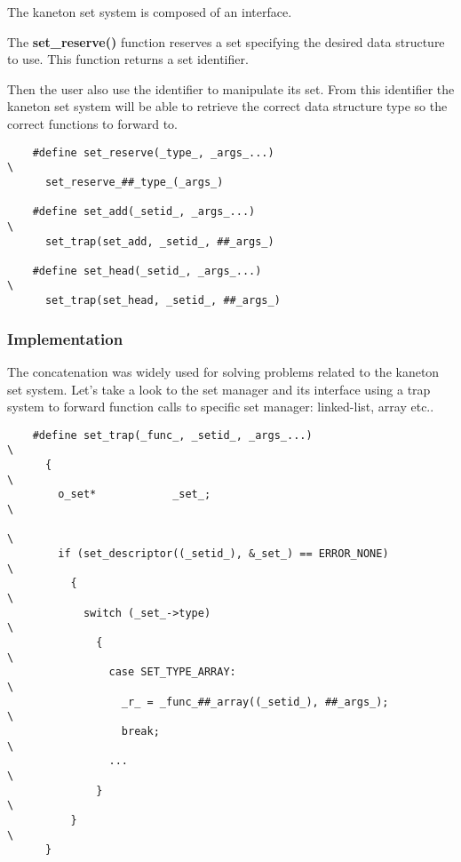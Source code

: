 {\begin{frame}[containsverbatim]
  The kaneton set system is composed of an interface.

  \nl

  The \textbf{set\_reserve()} function reserves a set specifying the desired
  data structure to use. This function returns a set identifier.

  \nl

  Then the user also use the identifier to manipulate its set. From this
  identifier the kaneton set system will be able to retrieve the correct
  data structure type so the correct functions to forward to.

  \begin{verbatim}
    #define set_reserve(_type_, _args_...)                                  \
      set_reserve_##_type_(_args_)

    #define set_add(_setid_, _args_...)                                     \
      set_trap(set_add, _setid_, ##_args_)

    #define set_head(_setid_, _args_...)                                    \
      set_trap(set_head, _setid_, ##_args_)
  \end{verbatim}
\end{frame}


\begin{frame}[containsverbatim]
  \frametitle{Implementation}

  The concatenation was widely used for solving problems related to
  the kaneton set system. Let's take a look to the set manager and its
  interface using a trap system to forward function calls to specific
  set manager: linked-list, array etc..

  \nl

  \begin{verbatim}
    #define set_trap(_func_, _setid_, _args_...)                            \
      {                                                                     \
        o_set*            _set_;                                            \
                                                                            \
        if (set_descriptor((_setid_), &_set_) == ERROR_NONE)                \
          {                                                                 \
            switch (_set_->type)                                            \
              {                                                             \
                case SET_TYPE_ARRAY:                                        \
                  _r_ = _func_##_array((_setid_), ##_args_);                \
                  break;                                                    \
                ...                                                         \
              }                                                             \
          }                                                                 \
      }
  \end{verbatim}
\end{frame}

}

